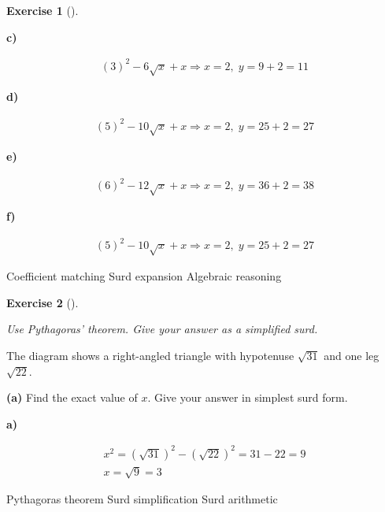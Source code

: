 \documentclass[
  letterpaper,
  DIV=11,
  numbers=noendperiod]{scrreprt}
\theoremstyle{definition}
\newtheorem{exercise}{Exercise}[chapter]
\theoremstyle{remark}
\begin{document}
\begin{exercise}[]
\begin{tcolorbox}
\textbf{c)}

\[
\begin{aligned}
(3)^2-6\sqrt{x}+x \Rightarrow x=2,\; y=9+2=11
\end{aligned}
\]

\textbf{d)}

\[
\begin{aligned}
(5)^2-10\sqrt{x}+x \Rightarrow x=2,\; y=25+2=27
\end{aligned}
\]

\textbf{e)}

\[
\begin{aligned}
(6)^2-12\sqrt{x}+x \Rightarrow x=2,\; y=36+2=38
\end{aligned}
\]

\textbf{f)}

\[
\begin{aligned}
(5)^2-10\sqrt{x}+x \Rightarrow x=2,\; y=25+2=27
\end{aligned}
\]

\end{tcolorbox}

{Coefficient matching} {Surd expansion} {Algebraic reasoning}

\end{exercise}

\begin{exercise}[]\protect\hypertarget{exr-u2-58}{}\label{exr-u2-58}

\emph{Use Pythagoras' theorem. Give your answer as a simplified surd.}

The diagram shows a right-angled triangle with hypotenuse \(\sqrt{31}\)
and one leg \(\sqrt{22}\).

\textbf{(a)} Find the exact value of \(x\). Give your answer in simplest
surd form.

\begin{tcolorbox}[enhanced jigsaw, opacitybacktitle=0.6, coltitle=black, arc=.35mm, colframe=quarto-callout-tip-color-frame, colback=white, bottomrule=.15mm, left=2mm, colbacktitle=quarto-callout-tip-color!10!white, titlerule=0mm, opacityback=0, title=\textcolor{quarto-callout-tip-color}{\faLightbulb}\hspace{0.5em}{🔍 View Solution}, leftrule=.75mm, breakable, rightrule=.15mm, bottomtitle=1mm, toptitle=1mm, toprule=.15mm]

\textbf{a)}

\[
\begin{aligned}
x^2 = (\sqrt{31})^2 - (\sqrt{22})^2 = 31 - 22 = 9 \\ x = \sqrt{9} = 3
\end{aligned}
\]

\end{tcolorbox}

{Pythagoras theorem} {Surd simplification} {Surd arithmetic}

\end{exercise}
\end{document}
